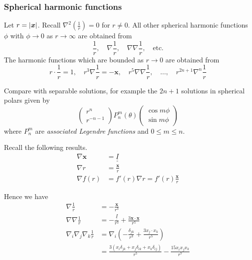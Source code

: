 \documentclass{jknotes}
\newcommand{\dunder}[1]{\underline{\underline{#1}}}
\newcommand{\x}{\bm{x}}
\newcommand{\inv}[1]{\frac{1}{#1}}
\begin{document}
\subsubsection{Spherical harmonic functions}
Let $r = \abs{\x}$. Recall $\nabla^2 (\frac{1}{r}) = 0$ for $r \ne 0$. All
other spherical harmonic functions $\phi$ with $\phi \to 0$ as $r \to \infty$
are obtained from 
\begin{equation}
	\frac{1}{r}, \hspace{1em}\nabla \frac{1}{r},\hspace{1em} \nabla \nabla
	\frac{1}{r}, \hspace{1em}\text{etc.}
\end{equation}
The harmonic functions which are bounded as $r \to 0$ are
obtained from 
\begin{equation}
	r \cdot \inv{r} = 1,\hspace{1em} r^3 \nabla \inv{r} = -\x,\hspace{1em} r^5 \nabla
\nabla \inv{r},\hspace{1em} \dots,\hspace{1em} r^{2n+1} \nabla^n \inv{r}
\end{equation}

Compare with separable solutions, for example the $2n+1$ solutions in
spherical polars given by
\begin{equation}
\begin{pmatrix} r^n \\ r^{-n-1} \end{pmatrix} P_n^m(\theta) \begin{pmatrix}
\cos m \phi \\ \sin m\phi\end{pmatrix}
\end{equation}
where $P_n^m$ are \emph{associated Legendre functions} and $0 \le m \le n$.


Recall the following results.
\begin{equation}
	\begin{aligned}
		\nabla \x &= \dunder{I} \\
		\nabla r &= \frac{\x}{r} \\
		\nabla f(r) &= f'(r) \nabla r = f'(r) \frac{\x}{r}
	\end{aligned}
\end{equation}

Hence we have
\begin{equation}
	\begin{aligned}
		\nabla \inv{r} &= -\frac{\x}{r^3} \\
		\nabla \nabla \inv{r} &= -\frac{\dunder{I}}{r^3} +
		\frac{3\x\cdot\x}{r^5} \\
		\nabla_i \nabla_j \nabla_k \inv{r} &= \nabla_i \left(
		-\frac{\delta_{jk}}{r^3} + \frac{3x_j\cdot x_k}{r^5}\right)\\
		&= \frac{3(x_i \delta_{jk} + x_j \delta_{ik} + x_k \delta_{ij})}{r^5}
		- \frac{15 x_i x_j x_k}{r^7}
	\end{aligned}
\end{equation}
\end{document}
